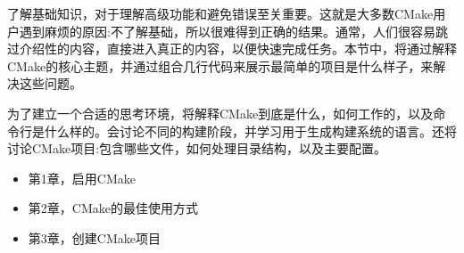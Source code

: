 了解基础知识，对于理解高级功能和避免错误至关重要。这就是大多数CMake用户遇到麻烦的原因:不了解基础，所以很难得到正确的结果。通常，人们很容易跳过介绍性的内容，直接进入真正的内容，以便快速完成任务。本节中，将通过解释CMake的核心主题，并通过组合几行代码来展示最简单的项目是什么样子，来解决这些问题。

为了建立一个合适的思考环境，将解释CMake到底是什么，如何工作的，以及命令行是什么样的。会讨论不同的构建阶段，并学习用于生成构建系统的语言。还将讨论CMake项目:包含哪些文件，如何处理目录结构，以及主要配置。

\begin{itemize}
\item 第1章，启用CMake
\item 第2章，CMake的最佳使用方式
\item 第3章，创建CMake项目
\end{itemize}